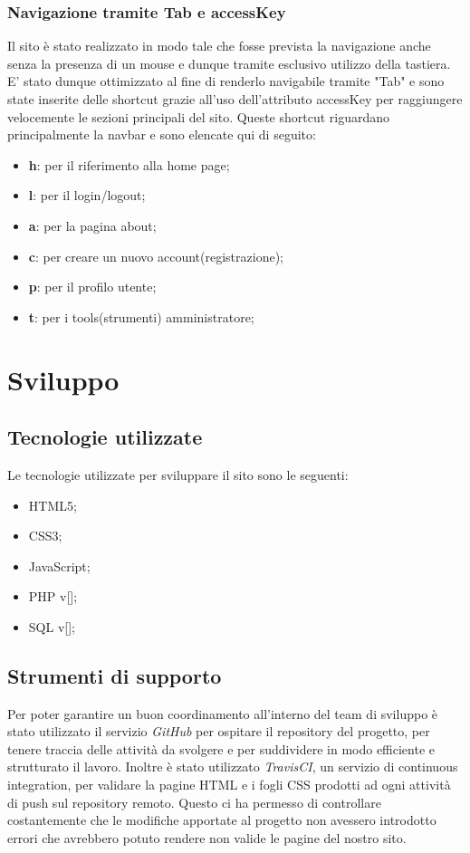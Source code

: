 \documentclass[12pt]{article}
\begin{document}
	\subsubsection{Navigazione tramite Tab e accessKey}
	Il sito è stato realizzato in modo tale che fosse prevista la navigazione anche senza la presenza di un mouse e dunque tramite esclusivo utilizzo della tastiera. E' stato dunque ottimizzato al fine di renderlo navigabile tramite "Tab" e sono state inserite delle shortcut grazie all'uso dell'attributo accessKey per raggiungere velocemente le sezioni principali del sito. Queste shortcut riguardano principalmente la navbar e sono elencate qui di seguito:
	\begin{itemize}
	\item \textbf{h}: per il riferimento alla home page;
	\item \textbf{l}: per il login/logout;
	\item \textbf{a}: per la pagina about;
	\item \textbf{c}: per creare un nuovo account(registrazione);
	\item \textbf{p}: per il profilo utente;
	\item \textbf{t}: per i tools(strumenti) amministratore;
	\end{itemize}
	

	\section{Sviluppo}
	\subsection{Tecnologie utilizzate}
	Le tecnologie utilizzate per sviluppare il sito sono le seguenti:
	\begin{itemize}
		\item HTML5;
		\item CSS3;
		\item JavaScript;
		\item PHP v[];
		\item SQL v[];
	\end{itemize}
	\subsection{Strumenti di supporto}
	Per poter garantire un buon coordinamento all'interno del team di sviluppo è stato utilizzato il servizio \emph{GitHub} per ospitare il repository del progetto, per tenere traccia delle attività da svolgere e per suddividere in modo efficiente e strutturato il lavoro. Inoltre è stato utilizzato \emph{TravisCI}, un servizio di continuous integration, per validare la pagine HTML e i fogli CSS prodotti ad ogni attività di push sul repository remoto. Questo ci ha permesso di controllare costantemente che le modifiche apportate al progetto non avessero introdotto errori che avrebbero potuto rendere non valide le pagine del nostro sito.
\end{document}
